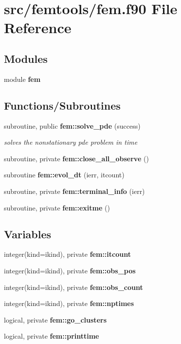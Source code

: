 \section{src/femtools/fem.f90 File Reference}
\label{fem_8f90}
\subsection*{Modules}
\begin{DoxyCompactItemize}
\item 
module {\bf fem}
\end{DoxyCompactItemize}
\subsection*{Functions/\+Subroutines}
\begin{DoxyCompactItemize}
\item 
subroutine, public {\bf fem\+::solve\+\_\+pde} (success)
\begin{DoxyCompactList}\small\item\em solves the nonstationary pde problem in time \end{DoxyCompactList}\item 
subroutine, private {\bf fem\+::close\+\_\+all\+\_\+observe} ()
\item 
subroutine {\bf fem\+::evol\+\_\+dt} (ierr, itcount)
\item 
subroutine, private {\bf fem\+::terminal\+\_\+info} (ierr)
\item 
subroutine, private {\bf fem\+::exitme} ()
\end{DoxyCompactItemize}
\subsection*{Variables}
\begin{DoxyCompactItemize}
\item 
integer(kind=ikind), private {\bf fem\+::itcount}
\item 
integer(kind=ikind), private {\bf fem\+::obs\+\_\+pos}
\item 
integer(kind=ikind), private {\bf fem\+::obs\+\_\+count}
\item 
integer(kind=ikind), private {\bf fem\+::nptimes}
\item 
logical, private {\bf fem\+::go\+\_\+clusters}
\item 
logical, private {\bf fem\+::printtime}
\end{DoxyCompactItemize}

